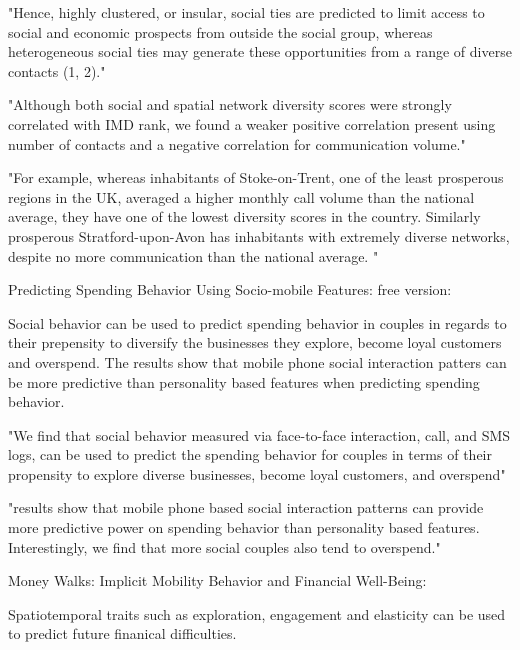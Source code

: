 "Hence, highly clustered, or insular, social ties are predicted to limit access to social and economic prospects from outside the social group, whereas heterogeneous social ties may generate these opportunities from a range of diverse contacts (1, 2)."

"Although both social and spatial network diversity scores were strongly correlated with IMD rank, we found a weaker positive correlation present using number of contacts and a negative correlation for communication volume."

"For example, whereas inhabitants of Stoke-on-Trent, one of the least prosperous regions in the UK, averaged a higher monthly call volume than the national average, they have one of the lowest diversity scores in the country. Similarly prosperous Stratford-upon-Avon has inhabitants with extremely diverse networks, despite no more communication than the national average. "




Predicting Spending Behavior Using Socio-mobile Features:
free version:

Social behavior can be used to predict spending behavior in couples in regards to their prepensity to diversify the businesses they explore, become loyal customers and overspend. The results show that mobile phone social interaction patters can be more predictive than personality based features when predicting spending behavior. 

"We find that social behavior measured via face-to-face interaction, call, and SMS logs, can be used to predict the spending behavior for couples in terms of their propensity to explore diverse businesses, become loyal customers, and overspend"

"results show that mobile phone based social interaction patterns can provide more predictive power on spending behavior than personality based features. Interestingly, we find that more social couples also tend to overspend."




Money Walks: Implicit Mobility Behavior and Financial Well-Being:

Spatiotemporal traits such as exploration, engagement and elasticity can be used to predict future finanical difficulties. 

